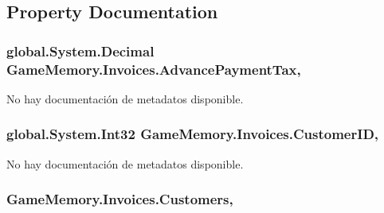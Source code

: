\subsection{Property Documentation}
\hypertarget{class_game_memory_1_1_invoices_a4c8fb4bba4408487adde6b055abec055}{
\subsubsection[{Advance\-Payment\-Tax}]{\setlength{\rightskip}{0pt plus 5cm}global.\-System.\-Decimal Game\-Memory.\-Invoices.\-Advance\-Payment\-Tax\hspace{0.3cm}{\ttfamily [get]}, {\ttfamily [set]}}}\label{class_game_memory_1_1_invoices_a4c8fb4bba4408487adde6b055abec055}


No hay documentación de metadatos disponible. 

\hypertarget{class_game_memory_1_1_invoices_aae5190344c921ece5f25d62d34200c33}{
\subsubsection[{Customer\-I\-D}]{\setlength{\rightskip}{0pt plus 5cm}global.\-System.\-Int32 Game\-Memory.\-Invoices.\-Customer\-I\-D\hspace{0.3cm}{\ttfamily [get]}, {\ttfamily [set]}}}\label{class_game_memory_1_1_invoices_aae5190344c921ece5f25d62d34200c33}


No hay documentación de metadatos disponible. 

\hypertarget{class_game_memory_1_1_invoices_a0acb5cf5f80c7dcda908489338671b37}{
\subsubsection[{Customers}]{ Game\-Memory.\-Invoices.\-Customers\hspace{0.3cm}{\ttfamily [get]}, {\ttfamily [set]}}}\label{class_game_memory_1_1_invoices_a0acb5cf5f80c7dcda908489338671b37}


